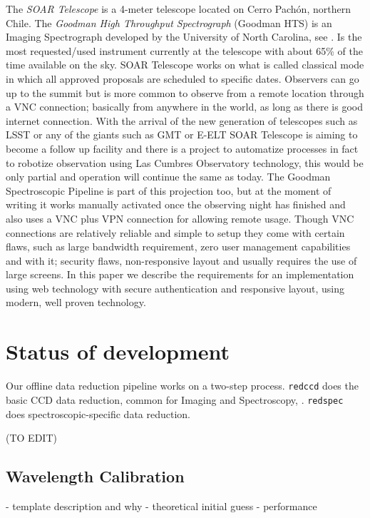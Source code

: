 \documentclass[11pt,twoside]{article}
\begin{document}
The \emph{SOAR Telescope} is a 4-meter telescope located on Cerro Pach\'on, northern Chile. The \emph{Goodman High Throughput Spectrograph} (Goodman HTS) is an Imaging Spectrograph developed by the University of North Carolina, see \citet{2004SPIE.5492..331C}. Is the most requested/used instrument currently at the telescope with about 65\% of the time available on the sky. SOAR Telescope works on what is called classical mode in which all approved proposals are scheduled to specific dates. Observers can go up to the summit but is more common to observe from a remote location through a VNC connection; basically from anywhere in the world, as long as there is good internet connection. With the arrival of the new generation of telescopes such as LSST or any of the giants such as GMT or E-ELT SOAR Telescope is aiming to become a follow up facility and there is a project to automatize processes in fact to robotize observation using Las Cumbres Observatory technology, this would be only partial and operation will continue the same as today. The Goodman Spectroscopic Pipeline is part of this projection too, but at the moment of writing it works manually activated once the observing night has finished and also uses a VNC plus VPN connection for allowing remote usage. Though VNC connections are relatively reliable and simple to setup they come with certain flaws, such as large bandwidth requirement, zero user management capabilities and with it; security flaws, non-responsive layout and usually requires the use of large screens. In this paper we describe the requirements for an implementation using web technology with secure authentication and responsive layout, using modern, well proven technology.

\section{Status of development}


Our offline data reduction pipeline works on a two-step process. \verb=redccd= does the basic CCD data reduction, common for Imaging and Spectroscopy, . \verb=redspec= does spectroscopic-specific data reduction.

(TO EDIT)
\subsection{Wavelength Calibration}

- template description and why
- theoretical initial guess
- performance
\end{document}
